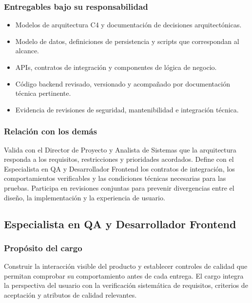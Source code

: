 \subsubsection{Entregables bajo su responsabilidad}
\begin{itemize}
  \item Modelos de arquitectura C4 y documentación de decisiones arquitectónicas.
  \item Modelo de datos, definiciones de persistencia y scripts que correspondan al alcance.
  \item APIs, contratos de integración y componentes de lógica de negocio.
  \item Código backend revisado, versionado y acompañado por documentación técnica pertinente.
  \item Evidencia de revisiones de seguridad, mantenibilidad e integración técnica.
\end{itemize}

\subsubsection{Relación con los demás}

Valida con el Director de Proyecto y Analista de Sistemas que la arquitectura
responda a los requisitos, restricciones y prioridades acordados. Define con el
Especialista en QA y Desarrollador Frontend los contratos de integración, los
comportamientos verificables y las condiciones técnicas necesarias para las
pruebas. Participa en revisiones conjuntas para prevenir divergencias entre el
diseño, la implementación y la experiencia de usuario.

\subsection{Especialista en QA y Desarrollador Frontend}

\begin{nota}
\lgQA
\end{nota}

\subsubsection{Propósito del cargo}

Construir la interacción visible del producto y establecer controles de calidad
que permitan comprobar su comportamiento antes de cada entrega. El cargo integra
la perspectiva del usuario con la verificación sistemática de requisitos,
criterios de aceptación y atributos de calidad relevantes.

